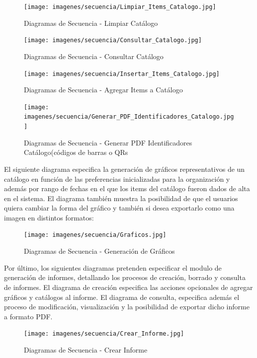 \documentclass[a4paper,11pt]{book}
\begin{document}
\begin{figure}[H] 
\centering 
\texttt{[image: imagenes/secuencia/Limpiar\_Items\_Catalogo.jpg]}
\caption{ Diagramas de Secuencia - Limpiar Catálogo\cite{diagrama}  }  
\end{figure}

\begin{figure}[H] 
\centering 
\texttt{[image: imagenes/secuencia/Consultar\_Catalogo.jpg]}
\caption{ Diagramas de Secuencia - Consultar Catálogo\cite{diagrama}  }  
\end{figure}

\begin{figure}[H] 
\centering 
\texttt{[image: imagenes/secuencia/Insertar\_Items\_Catalogo.jpg]}
\caption{ Diagramas de Secuencia - Agregar Items a Catálogo\cite{diagrama}  }  
\end{figure}

\begin{figure}[H] 
\centering 
\texttt{[image: imagenes/secuencia/Generar\_PDF\_Identificadores\_Catalogo.jpg]}
\caption{ Diagramas de Secuencia - Generar PDF Identificadores Catálogo(códigos de barras o QRs\cite{diagrama}  }  
\end{figure}

El siguiente diagrama especifica la generación de gráficos representativos de un catálogo en función de las preferencias inicializadas para la organización y además por rango de fechas en el que los items del catálogo fueron dados de alta en el sistema. El diagrama también muestra la posibilidad de que el usuarios quiera cambiar la forma del gráfico y también si desea exportarlo como una imagen en distintos formatos:

\begin{figure}[H] 
\centering 
\texttt{[image: imagenes/secuencia/Graficos.jpg]}
\caption{ Diagramas de Secuencia - Generación de Gráficos\cite{diagrama}  }  
\end{figure}

Por último, los siguientes diagramas pretenden especificar el modulo de generación de informes, detallando los procesos de creación, borrado y consulta de informes. El diagrama de creación especifica las acciones opcionales de agregar gráficos y catálogos al informe. El diagrama de consulta, especifica además el proceso de modificación, visualización y la posibilidad de exportar dicho informe a formato PDF. 

\begin{figure}[H] 
\centering 
\texttt{[image: imagenes/secuencia/Crear\_Informe.jpg]}
\caption{ Diagramas de Secuencia - Crear Informe\cite{diagrama}  }  
\end{figure}
\end{document}
